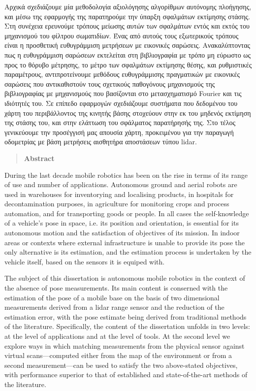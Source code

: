 Αρχικά σχεδιάζουμε μία μεθοδολογία αξιολόγησης αλγορίθμων αυτόνομης πλοήγησης,
και μέσω της εφαρμογής της παρατηρούμε την ύπαρξη σφαλμάτων εκτίμησης στάσης.
Στη συνέχεια ερευνούμε τρόπους μείωσης αυτών των σφαλμάτων εντός και εκτός του
μηχανισμού του φίλτρου σωματιδίων. Ένας από αυτούς τους εξωτερικούς τρόπους
είναι η προσθετική ευθυγράμμιση μετρήσεων με εικονικές σαρώσεις.
Ανακαλύπτοντας πως η ευθυγράμμιση σαρώσεων εκτελείται στη βιβλιογραφία με τρόπο
μη εύρωστο ως προς το θόρυβο μέτρησης, το μέτρο των σφαλμάτων εκτίμησης θέσης,
και ρυθμιστικές παραμέτρους, αντιπροτείνουμε μεθόδους ευθυγράμμισης πραγματικών
με εικονικές σαρώσεις που αντικαθιστούν τους σχετικούς παθογόνους μηχανισμούς
της βιβλιογραφίας με μηχανισμούς που βασίζονται στο μετασχηματισμό Fourier και
τις ιδιότητές του. Σε επίπεδο εφαρμογών σχεδιάζουμε συστήματα που δεδομένου
του χάρτη του περιβάλλοντος της κινητής βάσης στοχεύουν στην εκ του μηδενός
εκτίμηση της στάσης του, και στην ελάττωση του σφάλματος παρατήρησής της. Στο
τέλος γενικεύουμε την προσέγγισή μας απουσία χάρτη, προκειμένου για την
παραγωγή οδομετρίας με βάση μετρήσεις αισθητήρα αποστάσεων τύπου lidar.


\newpage

\begin{quotation}
\begin{center}
\textbf{Abstract}
\end{center}
\noindent
\end{quotation}

During the last decade mobile robotics has been on the rise in terms of its
range of use and number of applications. Autonomous ground and aerial robots
are used in warehouses for inventorying and localising products, in hospitals
for decontamination purposes, in agriculture for monitoring crops and process
automation, and for transporting goods or people. In all cases the
self-knowledge of a vehicle's pose in space, i.e. its position and orientation,
is essential for its autonomous motion and the satisfaction of objectives of
its mission. In indoor areas or contexts where external infrastructure is
unable to provide its pose the only alternative is its estimation, and the
estimation process is undertaken by the vehicle itself, based on the sensors it
is equiped with.

The subject of this dissertation is autonomous mobile robotics in the context
of the absence of pose measurements. Its main content is conserned with the
estimation of the pose of a mobile base on the basis of two dimensional
measurements derived from a lidar range sensor and the reduction of the
estimation error, with the pose estimate being derived from traditional methods
of the literature. Specifically, the content of the dissertation unfolds in two
levels: at the level of applications and at the level of tools. At the second
level we explore ways in which matching measurements from the physical sensor
against virtual scans---computed either from the map of the environment or from
a second measurement---can be used to satisfy the two above-stated objectives,
with performance superior to that of established and state-of-the-art methods
of the literature.

